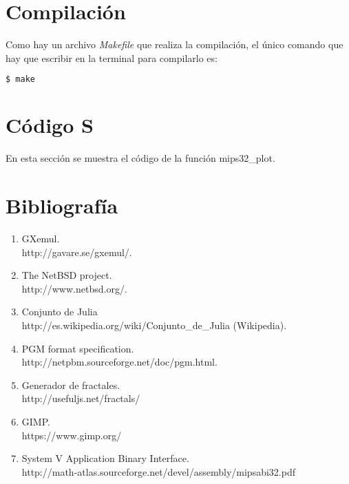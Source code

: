 \documentclass[a4paper,10pt]{article}
\begin{document}
\section{Compilación}

Como hay un archivo \textit{Makefile} que realiza la compilación, el único comando que hay que escribir en la terminal para compilarlo es:

\begin{lstlisting}[frame = single, language = bash, numbers=none]
$ make
\end{lstlisting}

\section{Código S}

En esta sección se muestra el código de la función mips32\_plot.



\section{Bibliografía}
\begin{enumerate}
\item GXemul. \\ http://gavare.se/gxemul/.
\item The NetBSD project. \\
	http://www.netbsd.org/.
\item Conjunto de Julia \\ 
	http://es.wikipedia.org/wiki/Conjunto\_de\_Julia (Wikipedia).
\item PGM format specification.\\
	http://netpbm.sourceforge.net/doc/pgm.html.
\item Generador de fractales. \\
	http://usefuljs.net/fractals/
\item GIMP. \\
	https://www.gimp.org/
\item System V Application Binary Interface. \\
	http://math-atlas.sourceforge.net/devel/assembly/mipsabi32.pdf
\end{enumerate}
\end{document}
